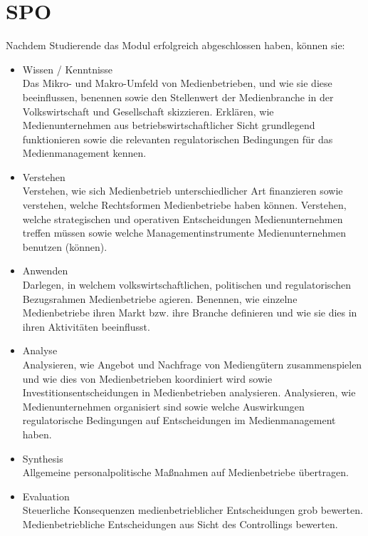 \section{SPO}

    Nachdem Studierende das Modul erfolgreich abgeschlossen haben, können sie:
    \begin{itemize}
        \item Wissen / Kenntnisse\\
            Das Mikro- und Makro-Umfeld von Medienbetrieben, und wie sie diese beeinflussen, benennen sowie den Stellenwert der Medienbranche in der Volkswirtschaft und Gesellschaft skizzieren.
            \newline
            Erklären, wie Medienunternehmen aus betriebswirtschaftlicher Sicht grundlegend funktionieren sowie die relevanten regulatorischen Bedingungen für das Medienmanagement kennen.
        \item Verstehen\\
            Verstehen, wie sich Medienbetrieb unterschiedlicher Art finanzieren sowie verstehen, welche Rechtsformen Medienbetriebe haben können.
            \newline
            Verstehen, welche strategischen und operativen Entscheidungen Medienunternehmen treffen müssen sowie welche Managementinstrumente Medienunternehmen benutzen (können).
        \item Anwenden\\
            Darlegen, in welchem volkswirtschaftlichen, politischen und regulatorischen Bezugsrahmen Medienbetriebe agieren. 
            \newline
            Benennen, wie einzelne Medienbetriebe ihren Markt bzw. ihre Branche definieren und wie sie dies in ihren Aktivitäten beeinflusst.
        \newpage
        \item Analyse\\
            Analysieren, wie Angebot und Nachfrage von Mediengütern zusammenspielen und wie dies von Medienbetrieben koordiniert wird sowie Investitionsentscheidungen in Medienbetrieben analysieren.
            \newline
            Analysieren, wie Medienunternehmen organisiert sind sowie welche Auswirkungen regulatorische Bedingungen auf Entscheidungen im Medienmanagement haben.
        \item Synthesis\\
            Allgemeine personalpolitische Maßnahmen auf Medienbetriebe übertragen.
        \item Evaluation\\
            Steuerliche Konsequenzen medienbetrieblicher Entscheidungen grob bewerten.
            \newline
            Medienbetriebliche Entscheidungen aus Sicht des Controllings bewerten.
    \end{itemize}
    
\newpage